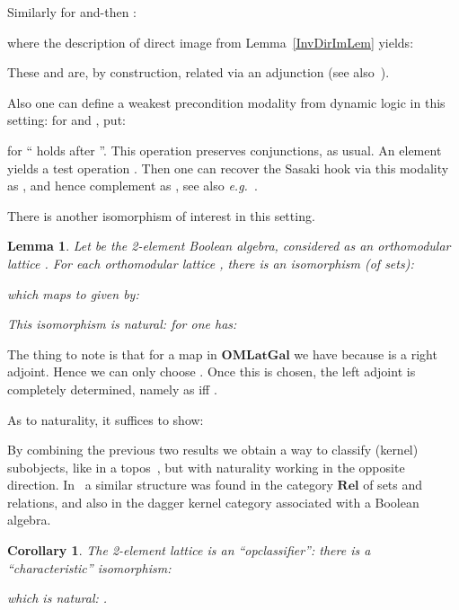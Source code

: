 \documentclass{article}
\newtheorem{lemma}[theorem]{Lemma}
\newtheorem{corollary}[theorem]{Corollary}
\newenvironment{proof}[1][Proof]{ \begin{trivlist}\item[\hskip \labelsep {\bfseries #1}]}{ \end{trivlist}}
\newcommand{\QED}{\hspace*{\fill}}
\newcommand{\Cat}[1]{\ensuremath{\mathbf{#1}}}
\newcommand{\Rel}{\Cat{Rel}\xspace}
\begin{document}
\noindent Similarly for and-then :


\noindent where the description of direct image from
Lemma~\ref{InvDirImLem} yields:


\noindent These  and  are, by construction, related
via an adjunction (see also~\cite{Finch70,CoeckeS04}).

Also one can define a weakest precondition modality  from dynamic
logic in this setting: for  and , put:


\noindent for `` holds after ''. This operation 
preserves conjunctions, as usual. An element  yields a test
operation . Then one can recover the
Sasaki hook  via this modality as , and hence
complement  as , see also
\textit{e.g.}~\cite{BaltagS06}.

There is another isomorphism of interest in this setting.


\begin{lemma}
\label{PointLem}
Let  be the 2-element Boolean algebra, considered as an
orthomodular lattice . For each orthomodular lattice
, there is an isomorphism (of sets): 


\noindent which maps  to 
given by:


\noindent This isomorphism is natural: for  one has:

\end{lemma}


\begin{proof}
The thing to note is that for a map  in
\Cat{OMLatGal} we have  because  is a right adjoint. Hence we can only choose .  Once this is chosen, the left adjoint  is completely determined, namely as  iff .

As to naturality, it suffices to show:

\end{proof}


By combining the previous two results we obtain a way to classify
(kernel) subobjects, like in a topos~\cite{MacLaneM92}, but with
naturality working in the opposite direction. In~\cite{HeunenJ09a} a
similar structure was found in the category \Rel of sets and
relations, and also in the dagger kernel category associated with a
Boolean algebra.


\begin{corollary}
\label{OpClassCor}
The 2-element lattice  is an ``opclassifier'':
there is a ``characteristic'' isomorphism:


\noindent which is natural: . \QED
\end{corollary}
\end{document}
